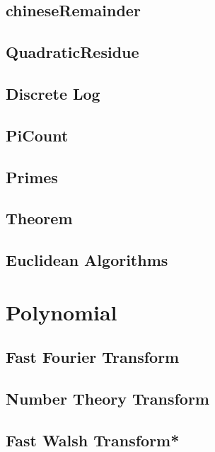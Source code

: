 \subsection{chineseRemainder}

\subsection{QuadraticResidue}

\subsection{Discrete Log}

\subsection{PiCount}

\subsection{Primes}

\subsection{Theorem}

\subsection{Euclidean Algorithms}


\section{Polynomial}
\subsection{Fast Fourier Transform}

\subsection{Number Theory Transform}

\subsection{Fast Walsh Transform*} %

%
